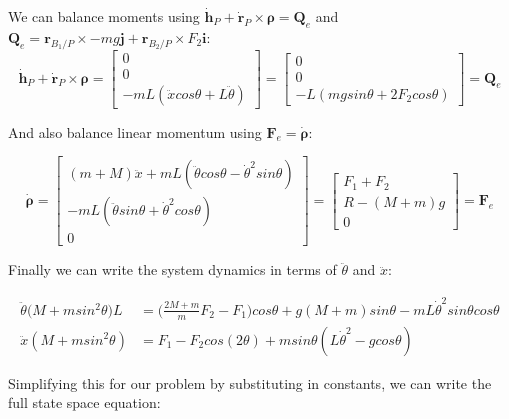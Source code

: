 \documentclass[../main.tex]{subfiles}
\begin{document}
We can balance moments using $\boldsymbol{\dot{h}}_P + \boldsymbol{\dot{r}}_P \times \boldsymbol{\rho} = \boldsymbol{Q}_{e}$ and $ \boldsymbol{Q}_{e} = \boldsymbol{r}_{B_1/P} \times -mg\boldsymbol{j} + \boldsymbol{r}_{B_2/P} \times F_2 \boldsymbol{i}$:
\begin{equation*}
\boldsymbol{\dot{h}}_P + \boldsymbol{\dot{r}}_P \times \boldsymbol{\rho} = 
\begin{bmatrix} 0 \\ 0 \\ -m L (\ddot{x} cos\theta + L\ddot{\theta}) \end{bmatrix} = \begin{bmatrix} 0 \\ 0 \\ -L(m g sin\theta + 2 F_2 cos \theta) \end{bmatrix} = \boldsymbol{Q}_e
\end{equation*}

And also balance linear momentum using $\boldsymbol{F}_e = \dot{\boldsymbol{\rho}}$:

\begin{equation*}
    \dot{\boldsymbol{\rho}} = \begin{bmatrix} (m+M)\ddot{x} + m L(\ddot{\theta}cos\theta - \dot{\theta}^2 sin\theta) \\ -m L(\ddot{\theta}sin\theta + \dot{\theta}^2 cos\theta) \\ 0 \end{bmatrix}
    = \begin{bmatrix} F_1 + F_2 \\ R-(M+m)g \\ 0 \end{bmatrix} = \boldsymbol{F}_e
\end{equation*}

Finally we can write the system dynamics in terms of $\ddot{\theta}$ and $\ddot{x}$:

\begin{align}
\ddot{\theta}\big(M+m sin^2\theta \big)L & = \bigg(\frac{2M+m}{m}F_2-F_1\bigg)cos\theta + g(M+m)sin\theta - mL\dot{\theta}^2 sin\theta cos\theta\\
\ddot{x}(M+m sin^2\theta) & = F_1 - F_2cos(2\theta)+ m sin\theta(L\dot{\theta}^2-g cos\theta)
\end{align}


Simplifying this for our problem by substituting in constants, we can write the full state space equation:
\end{document}
